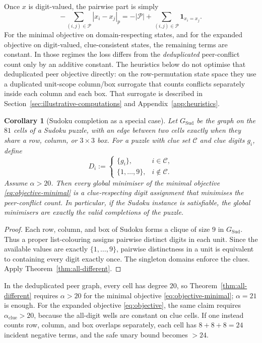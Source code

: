 \documentclass[11pt]{article}
\newtheorem{corollary}[theorem]{Corollary}
\begin{document}
Once \(x\) is digit-valued, the pairwise part is simply
\[
-\sum_{(i,j)\in\mathcal{P}} |x_i-x_j|_p
=
-|\mathcal P|+\sum_{(i,j)\in\mathcal{P}}\mathbf 1_{x_i=x_j}.
\]
For the minimal objective on domain-respecting states, and for the expanded objective on digit-valued, clue-consistent states, the remaining terms are constant. In those regimes the loss differs from the \emph{deduplicated} peer-conflict count only by an additive constant. The heuristics below do not optimise that deduplicated peer objective directly: on the row-permutation state space they use a duplicated unit-scope column/box surrogate that counts conflicts separately inside each column and each box. That surrogate is described in Section~\ref{sec:illustrative-computations} and Appendix~\ref{app:heuristics}.

\begin{corollary}[Sudoku completion as a special case]
\label{cor:sudoku-special-case}
Let \(G_{\mathrm{Sud}}\) be the graph on the \(81\) cells of a Sudoku puzzle, with an edge between two cells exactly when they share a row, column, or \(3\times 3\) box. For a puzzle with clue set \(\mathcal{C}\) and clue digits \(g_i\), define
\[
D_i :=
\begin{cases}
\{g_i\}, & i\in \mathcal{C},\\
\{1,\dots,9\}, & i\notin \mathcal{C}.
\end{cases}
\]
Assume \(\alpha>20\). Then every global minimiser of the minimal objective \eqref{eq:objective-minimal} is a clue-respecting digit assignment that minimises the peer-conflict count. In particular, if the Sudoku instance is satisfiable, the global minimisers are exactly the valid completions of the puzzle.
\end{corollary}

\begin{proof}
Each row, column, and box of Sudoku forms a clique of size \(9\) in \(G_{\mathrm{Sud}}\). Thus a proper list-colouring assigns pairwise distinct digits in each unit. Since the available values are exactly \(\{1,\dots,9\}\), pairwise distinctness in a unit is equivalent to containing every digit exactly once. The singleton domains enforce the clues. Apply Theorem~\ref{thm:all-different}.
\end{proof}

In the deduplicated peer graph, every cell has degree \(20\), so Theorem~\ref{thm:all-different} requires \(\alpha>20\) for the minimal objective \eqref{eq:objective-minimal}; \(\alpha=21\) is enough. For the expanded objective \eqref{eq:objective}, the same claim requires \(\alpha_{\mathrm{clue}}>20\), because the all-digit wells are constant on clue cells. If one instead counts row, column, and box overlaps separately, each cell has \(8+8+8=24\) incident negative terms, and the safe unary bound becomes \(>24\).
\end{document}
